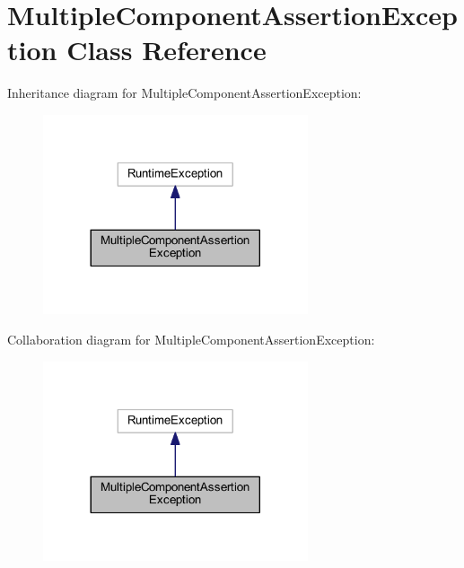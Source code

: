\hypertarget{classhamburgscleanest_1_1_data_tables_1_1_exceptions_1_1_multiple_component_assertion_exception}{}\section{Multiple\+Component\+Assertion\+Exception Class Reference}
\label{classhamburgscleanest_1_1_data_tables_1_1_exceptions_1_1_multiple_component_assertion_exception}


Inheritance diagram for Multiple\+Component\+Assertion\+Exception\+:
\nopagebreak
\begin{figure}[H]
\begin{center}
\leavevmode
\includegraphics[width=221pt]{classhamburgscleanest_1_1_data_tables_1_1_exceptions_1_1_multiple_component_assertion_exception__inherit__graph}
\end{center}
\end{figure}


Collaboration diagram for Multiple\+Component\+Assertion\+Exception\+:
\nopagebreak
\begin{figure}[H]
\begin{center}
\leavevmode
\includegraphics[width=221pt]{classhamburgscleanest_1_1_data_tables_1_1_exceptions_1_1_multiple_component_assertion_exception__coll__graph}
\end{center}
\end{figure}
